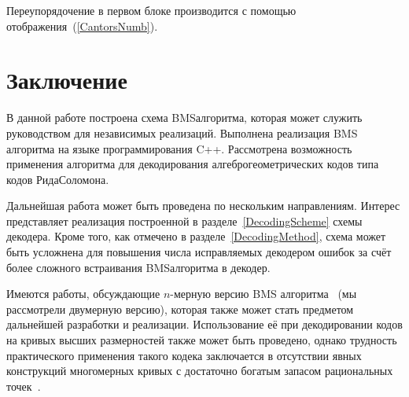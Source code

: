 \documentclass[14pt]{extarticle}
\begin{document}
Переупорядочение в первом блоке производится с помощью 
отображения~(\ref{CantorsNumb}).

\section*{Заключение}
В данной работе построена схема BMS\nbdash алгоритма, которая может служить
руководством для независимых реализаций. Выполнена реализация BMS\nbdash
алгоритма на языке программирования C++. Рассмотрена возможность применения
алгоритма для декодирования алгебро\nbdash геометрических кодов типа кодов
Рида\emd Соломона.

Дальнейшая работа может быть проведена по нескольким направлениям. Интерес
представляет реализация построенной в разделе~\ref{DecodingScheme} схемы
декодера. Кроме того, как отмечено в разделе~\ref{DecodingMethod}, схема может
быть усложнена для повышения числа исправляемых декодером ошибок за счёт более
сложного встраивания BMS\nbdash алгоритма в декодер.

Имеются работы, обсуждающие $n$-мерную версию BMS\nbdash
алгоритма~\cite{Sakata89} (мы рассмотрели двумерную версию), которая также может
стать предметом дальнейшей разработки и реализации. Использование её при
декодировании кодов на кривых высших размерностей также может быть проведено,
однако трудность практического применения такого кодека заключается в отсутствии
явных конструкций многомерных кривых с достаточно богатым запасом рациональных
точек~\cite{Justesen92}.
\end{document}
